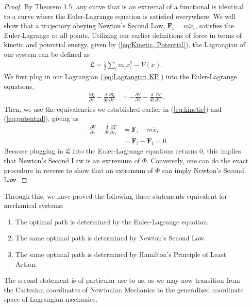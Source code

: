 \documentclass[10pt, psamsfonts]{amsart}
\theoremstyle{definition}
\theoremstyle{remark}
\numberwithin{equation}{section}
\begin{document}
\begin{proof}
By Theorem 1.5, any curve that is an extremal of a functional is identical to a curve where the Euler-Lagrange equation is satisfied everywhere. We will show that a trajectory obeying Newton's Second Law, $\textbf{F}_{i} = m\ddot{x}_i$, satisfies the Euler-Lagrange at all points. Utilizing our earlier definitions of force in terms of kinetic and potential energy, given by (\ref{eq:Kinetic, Potential}), the Lagrangian of our system can be defined as
\begin{align}
  \label{eq:Lagrangian KP}
  \mathfrak{L} = \frac{1}{2} \sum_i m_i \dot{x}_i^2 - V(x).
\end{align}
We first plug in our Lagrangian (\ref{eq:Lagrangian KP}) into the Euler-Lagrange equations,
\begin{align*}
  \frac{\partial \mathfrak{L}}{\partial x} - \frac{d}{dt} \frac{\partial \mathfrak{L}}{\partial \dot{x}} &= -\frac{\partial V}{\partial x} - \frac{d}{dt} \frac{\partial T}{\partial \dot{x}_i}.
\end{align*}
Then, we use the equivalencies we established earlier in (\ref{eq:kinetic}) and (\ref{eq:potential}), giving us
\begin{align*}
  -\frac{\partial V}{\partial x} - \frac{d}{dt} \frac{\partial T}{\partial \dot{x}_i} &= \bm{F}_i - m\ddot{x}_i \\
  &= \bm{F}_i - \bm{F}_i = 0.
\end{align*}
Because plugging in $\mathfrak{L}$ into the Euler-Lagrange equations returns 0, this implies that Newton's Second Law is an extremum of $\Phi$. Conversely, one can do the exact procedure in reverse to show that an extremum of $\Phi$ can imply Newton's Second Law.
\end{proof}

Through this, we have proved the following three statements equivalent for mechanical systems:
\begin{enumerate}
\item The optimal path is determined by the Euler-Lagrange equation.
\item The same optimal path is determined by Newton's Second Law.
\item The same optimal path is determined by Hamilton's Principle of Least Action.
\end{enumerate}
The second statement is of particular use to us, as we may now transition from the Cartesian coordinates of Newtonian Mechanics to the generalized coordinate space of Lagrangian mechanics.
\end{document}
